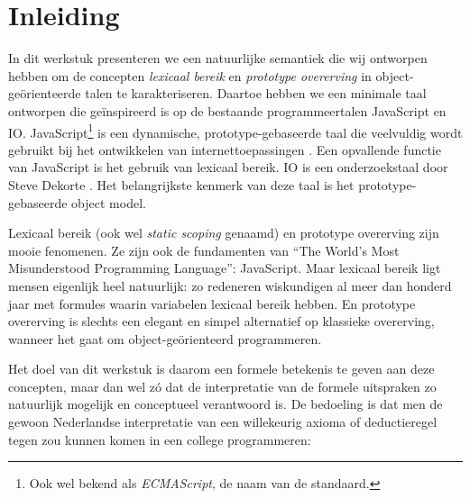 
\chapter{Inleiding}

In dit werkstuk presenteren we een natuurlijke semantiek die wij ontworpen hebben om de concepten \emph{lexicaal bereik} en \emph{prototype overerving} in object-geörienteerde talen te karakteriseren. Daartoe hebben we een minimale taal ontworpen die geïnspireerd is op de bestaande programmeertalen JavaScript en IO. JavaScript\footnote{Ook wel bekend als \emph{ECMAScript}, de naam van de standaard.} is een dynamische, prototype-gebaseerde taal die veelvuldig wordt gebruikt bij het ontwikkelen van internettoepassingen \citep{javascript}. Een opvallende functie van JavaScript is het gebruik van lexicaal bereik. IO is een onderzoekstaal door Steve Dekorte \citep{io}. Het belangrijkste kenmerk van deze taal is het prototype-gebaseerde object model.

Lexicaal bereik (ook wel \emph{static scoping} genaamd) en prototype overerving zijn mooie fenomenen. Ze zijn ook de fundamenten van “The World's Most Misunderstood Programming Language”: JavaScript. Maar lexicaal bereik ligt mensen eigenlijk heel natuurlijk: zo redeneren wiskundigen al meer dan honderd jaar met formules waarin variabelen lexicaal bereik hebben. En prototype overerving is slechts een elegant en simpel alternatief op klassieke overerving, wanneer het gaat om object-geörienteerd programmeren.

Het doel van dit werkstuk is daarom een formele betekenis te geven aan deze concepten, maar dan wel zó dat de interpretatie van de formele uitspraken zo natuurlijk mogelijk en conceptueel verantwoord is. De bedoeling is dat men de gewoon Nederlandse interpretatie van een willekeurig axioma of deductieregel tegen zou kunnen komen in een college programmeren:

